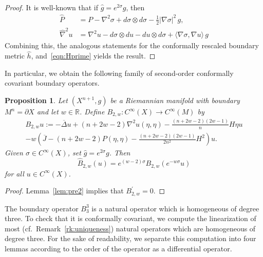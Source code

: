 \documentclass{amsart}
\newtheorem{prop}[thm]{Proposition}
\theoremstyle{definition}
\theoremstyle{remark}
\numberwithin{equation}{section}
\begin{document}
\begin{proof}
 It is well-known that if ${\widehat{g}}=e^{2\sigma}g$, then
 \begin{align*}
  {\widehat{P}} & = P - \nabla^2\sigma + d\sigma\otimes d\sigma - \frac{1}{2}{\lvert}\nabla\sigma{\rvert}^2\,g , \\
  {\widehat{\nabla}}^2u & = \nabla^2u - d\sigma\otimes du - du\otimes d\sigma + {\langle}\nabla\sigma,\nabla u{\rangle}\,g
 \end{align*}
 Combining this, the analogous statements for the conformally rescaled boundary metric ${\widehat{h}}$, and~\eqref{eqn:Hprime} yields the result.
\end{proof}

In particular, we obtain the following family of second-order conformally covariant boundary operators.

\begin{prop}
 \label{prop:oi2}
 Let $(X^{n+1},g)$ be a Riemannian manifold with boundary $M^n=\partial X$ and let $w\in{\mathbb{R}}$.  Define $B_{2,w}\colon C^\infty(X)\to C^\infty(M)$ by
 \begin{multline*}
  B_{2,w}u := -{\overline{\Delta}} u + (n+2w-2)\nabla^2u(\eta,\eta) - \frac{(n+2w-2)(2w-1)}{n}H\eta u \\ - w\left({\overline{J}} - (n+2w-2)P(\eta,\eta) - \frac{(n+2w-2)(2w-1)}{2n^2}H^2\right)u .
 \end{multline*}
 Given $\sigma\in C^\infty(X)$, set ${\widehat{g}}=e^{2\sigma}g$.  Then
 \[ {\widehat{B}}_{2,w}(u) = e^{(w-2)\sigma}B_{2,w}\left(e^{-w\sigma}u\right) \]
 for all $u\in C^\infty(X)$.
\end{prop}

\begin{proof}
 Lemma~\ref{lem:pre2} implies that $B_{2,w}^\prime=0$.
\end{proof}

The boundary operator $B_3^3$ is a natural operator which is homogeneous of degree three.  To check that it is conformally covariant, we compute the linearization of most (cf.\ Remark~\ref{rk:uniqueness}) natural operators which are homogeneous of degree three.  For the sake of readability, we separate this computation into four lemmas according to the order of the operator as a differential operator.
\end{document}
